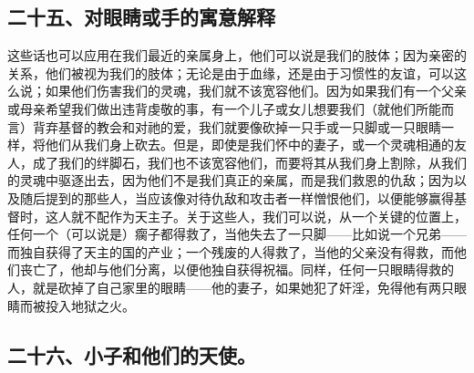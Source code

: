 
\subsection{二十五、对眼睛或手的寓意解释}

这些话也可以应用在我们最近的亲属身上，他们可以说是我们的肢体；因为亲密的关系，他们被视为我们的肢体；无论是由于血缘，还是由于习惯性的友谊，可以这么说；如果他们伤害我们的灵魂，我们就不该宽容他们。因为如果我们有一个父亲或母亲希望我们做出违背虔敬的事，有一个儿子或女儿想要我们（就他们所能而言）背弃基督的教会和对祂的爱，我们就要像砍掉一只手或一只脚或一只眼睛一样，将他们从我们身上砍去。但是，即使是我们怀中的妻子，或一个灵魂相通的友人，成了我们的绊脚石，我们也不该宽容他们，而要将其从我们身上割除，从我们的灵魂中驱逐出去，因为他们不是我们真正的亲属，而是我们救恩的仇敌；因为以及随后提到的那些人，当应该像对待仇敌和攻击者一样憎恨他们，以便能够赢得基督时，这人就不配作为天主子。关于这些人，我们可以说，从一个关键的位置上，任何一个（可以说是）瘸子都得救了，当他失去了一只脚——比如说一个兄弟——而独自获得了天主的国的产业；一个残废的人得救了，当他的父亲没有得救，而他们丧亡了，他却与他们分离，以便他独自获得祝福。同样，任何一只眼睛得救的人，就是砍掉了自己家里的眼睛——他的妻子，如果她犯了奸淫，免得他有两只眼睛而被投入地狱之火。\par


\subsection{二十六、小子和他们的天使。}

